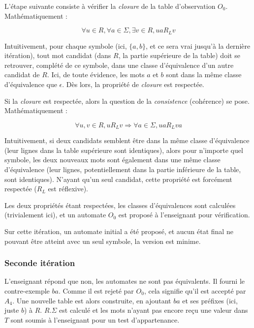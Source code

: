 \vspace{1cm}
L'étape suivante consiste à vérifier la \emph{closure} de la table d'observation $O_0$. Mathématiquement :

$$ \forall u \in R, \forall a \in \Sigma, \exists v \in R, ua R_L v$$

Intuitivement, pour chaque symbole (ici, $\{a,b\}$, et ce sera vrai jusqu'à la dernière itération), tout mot candidat (dans $R$, la partie supérieure de la table) doit se retrouver, complété de ce symbole, dans une classe d'équivalence d'un autre candidat de $R$. Ici, de toute évidence, les mots $a$ et $b$ sont dans la même classe d'équivalence que $\epsilon$. Dès lors, la propriété de \emph{closure} est respectée.

Si la \emph{closure} est respectée, alors la question de la \emph{consistence} (cohérence) se pose. Mathématiquement :

$$ \forall u,v \in R, u R_L v \Rightarrow \forall a \in \Sigma, ua R_L va$$

Intuitivement, si deux candidats semblent être dans la même classe d'équivalence (leur lignes dans la table supérieure sont identiques), alors pour n'importe quel symbole, les deux nouveaux mots sont également dans une même classe d'équivalence (leur lignes, potentiellement dans la partie inférieure de la table, sont identiques). N'ayant qu'un seul candidat, cette propriété est forcément respectée ($R_L$ est réflexive).

Les deux propriétés étant respectées, les classes d'équivalences sont calculées (trivialement ici), et un automate $O_0$ est proposé à l'enseignant pour vérification.

Sur cette itération, un automate initial a été proposé, et aucun état final ne pouvant être atteint avec un seul symbole, la version est minime.

\subsubsection{Seconde itération}

L'enseignant répond que non, les automates ne sont pas équivalents. Il fourni le contre-exemple $ba$. Comme il est rejeté par $O_0$, cela signifie qu'il est accepté par $A_4$. Une nouvelle table est alors construite, en ajoutant $ba$ et ses préfixes (ici, juste $b$) à $R$. $R.\Sigma$ est calculé et les mots n'ayant pas encore reçu une valeur dans $T$ sont soumis à l'enseignant pour un test d'appartenance.
\vspace{1cm}


